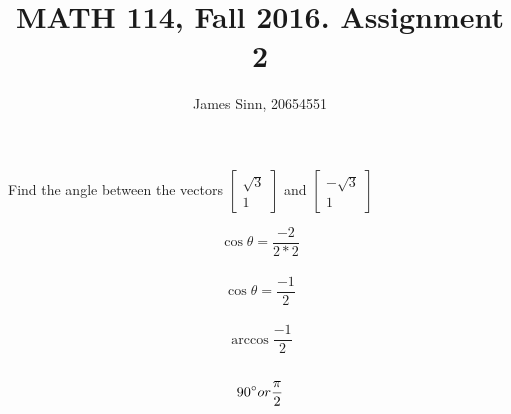 \documentclass[12pt]{article}
\newenvironment{problem}[2][Problem]{\begin{trivlist}
\item[\hskip \labelsep {\bfseries #1}\hskip \labelsep {\bfseries #2.}]}{\end{trivlist}}
\begin{document}

\title{MATH 114, Fall 2016. Assignment 2}
\author{James Sinn, 20654551}
\maketitle

\begin{problem}{1}
Find the angle between the vectors
\(\left[
\begin{matrix}
\sqrt{3}\\
1
\end{matrix}
\right]\)
and
\(\left[
\begin{matrix}
-\sqrt{3}\\
1
\end{matrix}
\right]\)
\end{problem}


\begin{flushleft}
\[\cos\theta = \frac{-2}{2*2}\]\\
\[\cos\theta = \frac {-1}{2}\]\\
\[\arccos{\frac{-1}{2}}\]\\
\[90\degree or \frac{\pi}{2}\]
\end{flushleft}

\begin{problem}{2}

\end{problem}
\end{document}
